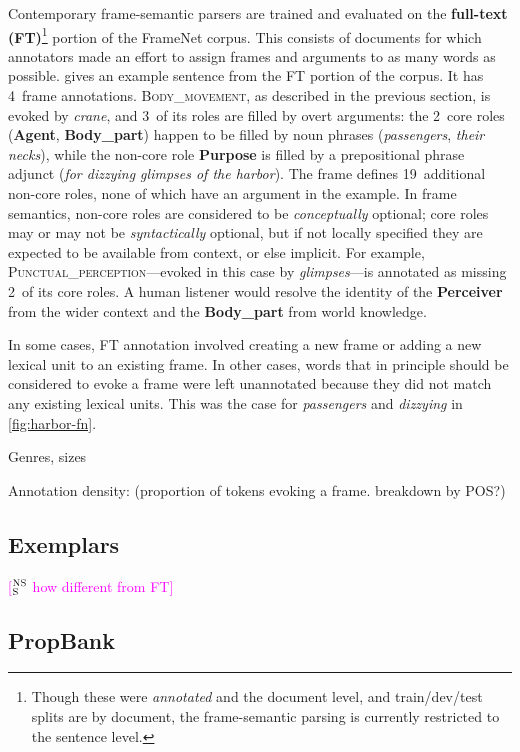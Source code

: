 \documentclass[11pt,a4paper]{article}
\newcommand{\ensuretext}[1]{#1}
\newcommand{\nssmarker}{\ensuretext{\textcolor{magenta}{\ensuremath{^{\textsc{NS}}_{\textsc{S}}}}}}
\newcommand{\arkcomment}[3]{\ensuretext{\textcolor{#3}{[#1 #2]}}}
\newcommand{\nss}[1]{\arkcomment{\nssmarker}{#1}{magenta}}
\newcommand{\fnf}[1]{\textsc{\textsf{#1}}} %
\newcommand{\fnr}[1]{\textbf{\textsf{#1}}} %
\begin{document}
Contemporary frame-semantic parsers are trained and evaluated on the \textbf{full-text (FT)}\footnote{Though these 
were \emph{annotated} and the document level, and train/dev/test splits are by document, the frame-semantic parsing 
is currently restricted to the sentence level.} portion 
of the FrameNet corpus. This consists of documents for which annotators made an effort 
to assign frames and arguments to as many words as possible. 
 gives an example sentence from the FT portion of the corpus. 
It has 4~frame annotations. \fnf{Body\_movement}, as described in the previous section, 
is evoked by \textit{crane}, and 3~of its roles are filled by overt arguments: 
the 2~core roles (\fnr{Agent}, \fnr{Body\_part}) happen to be filled by noun phrases 
(\textit{passengers}, \textit{their necks}), while the non-core role \fnr{Purpose} is filled by a 
prepositional phrase adjunct (\textit{for dizzying glimpses of the harbor}).
The frame defines 19~additional non-core roles, none of which have an argument in the example.
In frame semantics, non-core roles are considered to be \emph{conceptually} optional; 
core roles may or may not be \emph{syntactically} optional, but if not locally specified they are 
expected to be available from context, or else implicit.
For example, \fnf{Punctual\_perception}---evoked in this case by \textit{glimpses}---is annotated 
as missing 2~of its core roles. A human listener would resolve the identity of the \fnr{Perceiver} 
from the wider context and the \fnr{Body\_part} from world knowledge. 

In some cases, FT annotation involved creating a new frame or adding a new lexical unit to an existing frame. 
In other cases, words that in principle should be considered to evoke a frame were left unannotated 
because they did not match any existing lexical units. 
This was the case for \textit{passengers} and \textit{dizzying} in \cref{fig:harbor-fn}.

Genres, sizes

Annotation density: (proportion of tokens evoking a frame. breakdown by POS?)

\subsection{Exemplars}\label{sec:exemplars}

\nss{how different from FT}

\subsection{PropBank}\label{sec:pb}
\end{document}
